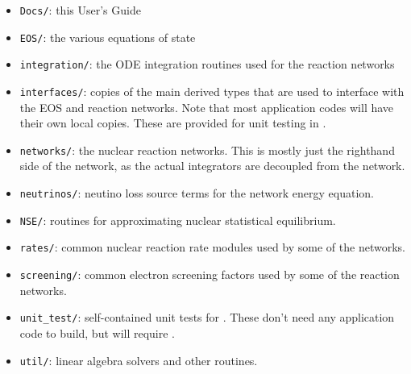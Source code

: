\begin{itemize}
\item {\tt Docs/}: this User's Guide

\item {\tt EOS/}: the various equations of state

\item {\tt integration/}: the ODE integration routines used for the
  reaction networks

\item {\tt interfaces/}: copies of the main derived types that are used to
  interface with the EOS and reaction networks.  Note that most application
  codes will have their own local copies.  These are provided for unit testing
  in \microphysics.

\item {\tt networks/}: the nuclear reaction networks.  This is mostly just the
  righthand side of the network, as the actual integrators are decoupled from
  the network.

\item {\tt neutrinos/}: neutino loss source terms for the network energy equation.

\item {\tt NSE/}: routines for approximating nuclear statistical equilibrium.

\item {\tt rates/}: common nuclear reaction rate modules used by some of the 
  networks.

\item {\tt screening/}: common electron screening factors used by some of the 
  reaction networks.

\item {\tt unit\_test/}: self-contained unit tests for \microphysics.  These don't
  need any application code to build, but will require \boxlib.

\item {\tt util/}: linear algebra solvers and other routines.

\end{itemize}

